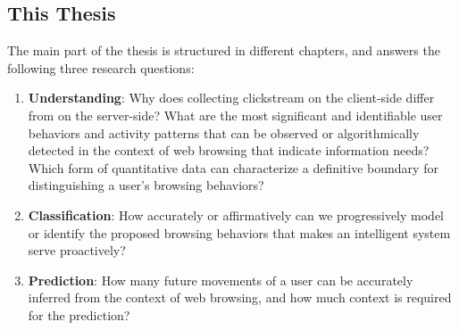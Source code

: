 \subsection{This Thesis}



The main part of the thesis is structured in different chapters, and answers the following
three research questions:

\begin{enumerate}
    \item \textbf{Understanding}: Why does collecting clickstream on the client-side differ 
        from on the server-side?
        What are the most significant and identifiable user behaviors and activity patterns 
        that can be observed or algorithmically detected in the context of web browsing that 
        indicate information needs?
        Which form of quantitative data can characterize a definitive boundary for 
        distinguishing a user's browsing behaviors?
    \item \textbf{Classification}: How accurately or affirmatively can we progressively model 
        or identify the proposed browsing behaviors that makes an intelligent system 
        serve proactively?
    \item \textbf{Prediction}: How many future movements of a user can be accurately inferred 
        from the context of web browsing, and how much context is required for the prediction?

\end{enumerate}

